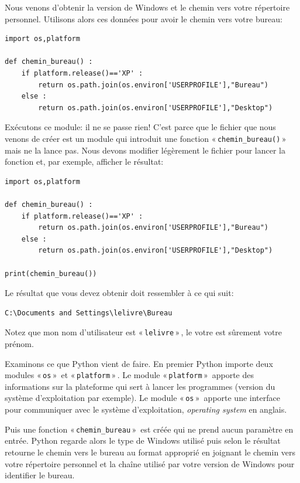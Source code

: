 Nous venons d'obtenir la version de Windows et le chemin vers votre répertoire personnel.
Utilisons alors ces données pour avoir le chemin vers votre bureau:

\begin{Verbatim}[frame=single,rulecolor=\color{mbleu}, label=à taper]
import os,platform

def chemin_bureau() :
    if platform.release()=='XP' :
        return os.path.join(os.environ['USERPROFILE'],"Bureau")
    else :
        return os.path.join(os.environ['USERPROFILE'],"Desktop")
\end{Verbatim}

Exécutons ce module: il ne se passe rien! C'est parce que le fichier que nous venons de créer est un module qui introduit une fonction « \texttt{chemin\_bureau()} »  mais ne la lance pas. Nous devons modifier légèrement le fichier pour lancer la fonction et, par exemple, afficher le résultat:

\begin{Verbatim}[frame=single,rulecolor=\color{mbleu}, label=à taper]
import os,platform

def chemin_bureau() :
    if platform.release()=='XP' :
        return os.path.join(os.environ['USERPROFILE'],"Bureau")
    else :
        return os.path.join(os.environ['USERPROFILE'],"Desktop")
    
print(chemin_bureau())
\end{Verbatim}

Le résultat que vous devez obtenir doit ressembler à ce qui suit:

\begin{Verbatim}[frame=single,rulecolor=\color{gray}, label=résultat]
C:\Documents and Settings\lelivre\Bureau
\end{Verbatim}

Notez que mon nom d'utilisateur est « \texttt{lelivre} » , le votre est sûrement votre prénom.

Examinons ce que Python vient de faire. En premier Python importe deux modules « \texttt{os} »  et « \texttt{platform} » . Le module « \texttt{platform} »  apporte des informations sur la plateforme qui sert à lancer les programmes (version du système d'exploitation par exemple). Le module « \texttt{os} »  apporte une interface pour communiquer avec le système d'exploitation, \emph{operating system} en anglais.

Puis une fonction « \texttt{chemin\_bureau} »  est créée qui ne prend aucun paramètre en entrée. Python regarde alors le type de Windows utilisé puis selon le résultat retourne le chemin vers le bureau au format approprié en joignant le chemin vers votre répertoire personnel et la chaîne utilisé par votre version de Windows pour identifier le bureau.

